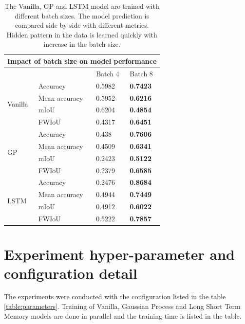 	
	\begin{table}
		\centering
		\begin{tabular}{|l|l|l|l|} 
			\hline
			\multicolumn{4}{|l|}{\textbf{Impact of batch size on model performance} }      \\ 
			\hline
			&               & Batch 4 & Batch 8          \\ 
			\hline
			\multirow{4}{*}{Vanilla} & Accuracy      & 0.5982  & \textbf{0.7423}  \\ 
			\cline{2-4}
			& Mean accuracy & 0.5952  & \textbf{0.6216}  \\ 
			\cline{2-4}
			& mIoU          & 0.6204  & \textbf{0.4854}  \\ 
			\cline{2-4}
			& FWIoU         & 0.4317  & \textbf{0.6451}  \\ 
			\hline
			\multirow{4}{*}{GP}      & Accuracy      & 0.438   & \textbf{0.7606}  \\ 
			\cline{2-4}
			& Mean accuracy & 0.4509  & \textbf{0.6341}  \\ 
			\cline{2-4}
			& mIoU          & 0.2423  & \textbf{0.5122}  \\ 
			\cline{2-4}
			& FWIoU         & 0.2379  & \textbf{0.6585}  \\ 
			\hline
			\multirow{4}{*}{LSTM}    & Accuracy      & 0.2476  & \textbf{0.8684}  \\ 
			\cline{2-4}
			& Mean accuracy & 0.4944  & \textbf{0.7449}  \\ 
			\cline{2-4}
			& mIoU          & 0.4912  & \textbf{0.6022}  \\ 
			\cline{2-4}
			& FWIoU         & 0.5222  & \textbf{0.7857}  \\
			\hline
		\end{tabular}
		\caption{The Vanilla, GP and LSTM model are trained with different batch sizes. The model prediction is compared side by side with different metrics. Hidden pattern in the data is learned quickly with increase in the batch size.}
	\label{table:hype3}
	\end{table}

	\newpage
	\section{Experiment hyper-parameter and configuration detail }
	
	The experiments were conducted with the configuration listed in the table \ref{table:parameters}. Training of Vanilla, Gaussian Process and Long Short Term Memory models are done in parallel and the training time is listed in the table.
	
